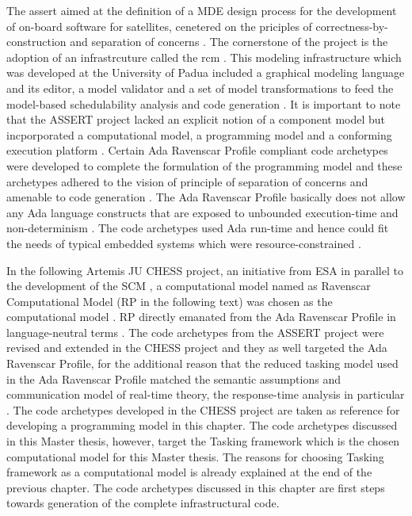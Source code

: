 The \ac{assert} aimed at the definition of a MDE design process for the development of on-board software for satellites, cenetered on the priciples of correctness-by-construction and separation of concerns \cite{PhdThesis}. The cornerstone of the project is the adoption of an infrastrcuture called the \ac{rcm} \cite{PhdThesis}. This modeling infrastructure which was developed at the University of Padua \cite{ScheduAnaly} included a graphical modeling language and its editor, a model validator and a set of model transformations to feed the model-based schedulability analysis and code generation \cite{ScheduAnaly}. It is important to note that the ASSERT project lacked an explicit notion of a component model but incporporated a computational model, a programming model and a conforming execution platform \cite{PhdThesis}. Certain Ada Ravenscar Profile compliant code archetypes were developed to complete the formulation of the programming model and these archetypes adhered to the vision of principle of separation of concerns and amenable to code generation \cite{CharEvoRAVCodeAr}. The Ada Ravenscar Profile basically does not allow any Ada language constructs that are exposed to unbounded execution-time and non-determinism \cite{RAVCodeAr}. The code archetypes used Ada run-time and hence could fit the needs of typical embedded systems which were resource-constrained \cite{RAVCodeAr}.   

In the following Artemis JU CHESS project, an initiative from ESA in parallel to the development of the SCM \cite{CompBasedProcess}\cite{PhdThesis}, a computational model named as Ravenscar Computational Model (RP in the following text) was chosen as the computational model \cite{ScheduAnaly}. RP directly emanated from the Ada Ravenscar Profile in language-neutral terms \cite{CharEvoRAVCodeAr}\cite{EvoRAVCodeAr}. The code archetypes from the ASSERT project were revised and extended in the CHESS project and they as well targeted the Ada Ravenscar Profile, for the additional reason that the reduced tasking model used in the Ada Ravenscar Profile matched the semantic assumptions and communication model of real-time theory, the response-time analysis in particular \cite{CharEvoRAVCodeAr}. The code archetypes developed in the CHESS project \cite{EvoRAVCodeAr} are taken as reference for developing a programming model in this chapter. The code archetypes discussed in this Master thesis, however, target the Tasking framework which is the chosen computational model for this Master thesis. The reasons for choosing Tasking framework as a computational model is already explained at the end of the previous chapter. The code archetypes discussed in this chapter are first steps towards generation of the complete infrastructural code. 

